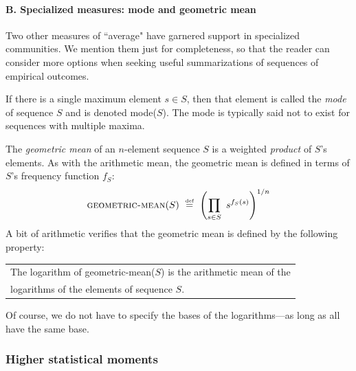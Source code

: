 \paragraph{B. Specialized measures: mode and geometric mean}

Two other measures of ``average" have garnered support in specialized communities.  We mention them just for completeness, so that the reader can consider more options when seeking useful summarizations of sequences of empirical outcomes.

\medskip

 

\noindent
If there is a single maximum element $s \in S$, then that element is called the {\em mode} of sequence $S$ and is denoted {\sc mode}($S$).  The mode is typically said not to exist for sequences with multiple maxima.

\medskip

   

\noindent
The {\it geometric mean} of an $n$-element sequence $S$ is a weighted {\em product} of $S$'s elements.  As with the arithmetic mean, the geometric mean is defined in terms of $S$'s frequency function $f_S$:
\[ \mbox{\sc geometric-mean}(S) \ \stackrel{\mbox{{\tiny def}}}{=} \  \left(\prod_{s \in S} \ s^{f_S(s)} \right)^{1/n}
\]
A bit of arithmetic verifies that the geometric mean is defined by the following property:

\smallskip

{\em 
\begin{tabular}{l}
The logarithm of {\sc geometric-mean}($S$) is the arithmetic mean of the \\
logarithms of the elements of sequence $S$.
\end{tabular}
}

\smallskip

\noindent
Of course, we do not have to specify the bases of the logarithms---as long as all have the same base.
 
\subsubsection{Higher statistical moments}
\label{sec:mean-plus-moments}


